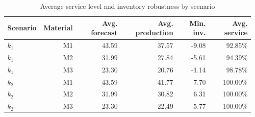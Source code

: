 \begin{table}[H]
\centering
\caption{Average service level and inventory robustness by scenario}
\label{tab:demo-v1-service-levels}
\begin{tabular}{lrrrrr}
\toprule
Scenario & Material & Avg. forecast & Avg. production & Min. inv. & Avg. service \\
\midrule
$k_1$ & M1 & 43.59 & 37.57 & -9.08 & 92.85\% \\
$k_1$ & M2 & 31.99 & 27.84 & -5.61 & 94.39\% \\
$k_1$ & M3 & 23.30 & 20.76 & -1.14 & 98.78\% \\
$k_2$ & M1 & 43.59 & 41.77 & 7.70 & 100.00\% \\
$k_2$ & M2 & 31.99 & 30.82 & 6.31 & 100.00\% \\
$k_2$ & M3 & 23.30 & 22.49 & 5.77 & 100.00\% \\
\bottomrule
\end{tabular}
\end{table}
